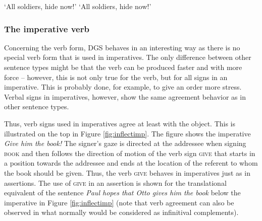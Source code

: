 \begin{exe}
\ex\label{quantifieddpimp}\begin{xlist}
\ex {}
%
\glt `All soldiers, hide now!' \label{quantifieddpimpa}
\ex {}
%
\glt `All soldiers, hide now!' \label{quantifieddpimpb}
\end{xlist}
\end{exe}

\subsubsection{The imperative verb}
\noindent Concerning the verb form, DGS behaves in an interesting way as there is no special verb form that is used in imperatives. The only difference between other sentence types might be that the verb can be produced  faster and with more force -- however, this is not only true for the verb, but for all signs in an imperative. This is probably done, for example, to give an order more stress. Verbal signs in imperatives, however, show the same agreement behavior as in other sentence types. 

Thus, verb signs used in imperatives agree at least with the object. This is illustrated on the top in Figure \ref{fig:inflectimp}. The figure shows the imperative \textit{Give him the book!} The signer's gaze is directed at the addressee when signing \textsc{book} and then follows the direction of motion of the verb sign \textsc{give} that starts in a position towards the addressee and ends at the location of the referent to whom the book should be given. Thus, the verb \textsc{give} behaves in imperatives just as in assertions. The use of \textsc{give} in an assertion is shown for the translational equivalent of the sentence \textit{Paul hopes that Otto gives him the book} below the imperative in Figure \ref{fig:inflectimp} (note that verb agreement can also be observed in what normally would be considered as infinitival complements).


